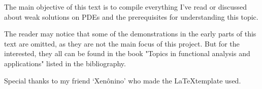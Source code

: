 The main objective of this text is to compile everything I've read or discussed about weak solutions on PDEs and the prerequisites for understanding this topic.  

The reader may notice that some of the demonstrations in the early parts of this text are omitted, as they are not the main focus of this project. But for the interested, they all can be found in the book "Topics in functional analysis and applications" listed in the bibliography.

Special thanks to my friend `Xenônino' who made the \LaTeX template used.